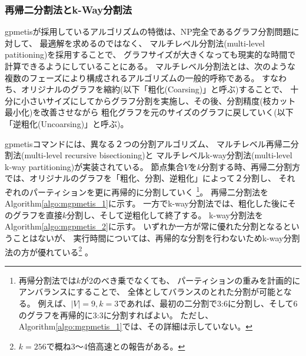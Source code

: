 


\subsubsection{再帰二分割法とk-Way分割法}
gpmetisが採用しているアルゴリズムの特徴は、NP完全であるグラフ分割問題に対して、
最適解を求めるのではなく、
マルチレベル分割法(multi-level patitioning)を採用することで、
グラフサイズが大きくなっても現実的な時間で計算できるようにしていることにある。
マルチレベル分割法とは、次のような複数のフェーズにより構成されるアルゴリズムの一般的呼称である。
すなわち、オリジナルのグラフを縮約(以下「粗化(Coarsing)」と呼ぶ)することで、
十分に小さいサイズにしてからグラフ分割を実施し、その後、分割精度(枝カット最小化)を改善させながら
粗化グラフを元のサイズのグラフに戻していく(以下「逆粗化(Uncoarsing)」と呼ぶ)。

gpmetisコマンドには、異なる２つの分割アルゴリズム、
マルチレベル再帰二分割法(multi-level recursive bisectioning)と
マルチレベルk-way分割法(multi-level k-way partitioning)が実装されている。
節点集合$V$を$k$分割する時、再帰二分割方では、オリジナルのグラフを「粗化、分割、逆粗化」によって２分割し、
それぞれのパーティションを更に再帰的に分割していく
\footnote{
再帰分割法では$k$が2のべき乗でなくても、
パーティションの重みを計画的にアンバランスにすることで、
全体としてバランスのとれた分割が可能となる。
例えば、$|V|=9, k=3$であれば、最初の二分割で3:6に分割し、そして6のグラフを再帰的に3:3に分割すればよい。
ただし、Algorithm\ref{algo:mgpmetis_1}では、その詳細は示していない。
}。
再帰二分割法をAlgorithm\ref{algo:mgpmetis_1}に示す。
一方でk-way分割法では、粗化した後にそのグラフを直接$k$分割し、そして逆粗化して終了する。
k-way分割法をAlgorithm\ref{algo:mgpmetis_2}に示す。
いずれか一方が常に優れた分割となるということはないが、
実行時間については、再帰的な分割を行わないためk-way分割法の方が優れている\footnote{
$k=256$で概ね3〜4倍高速との報告がある\cite{Karypis1998}。}
。

